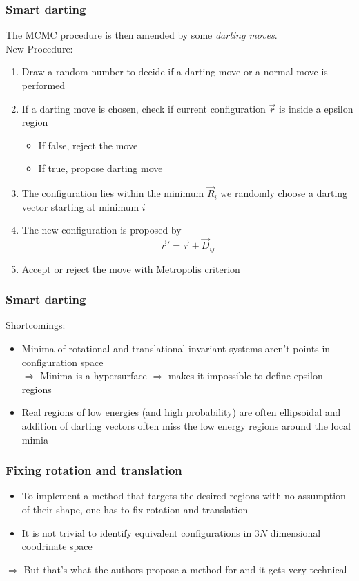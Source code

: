 \documentclass{beamer}
\begin{document}
	\begin{frame}
		\frametitle{Smart darting}
		The MCMC procedure is then amended by some \emph{darting moves}.\\
		New Procedure:
		\begin{enumerate}
			\item Draw a random number to decide if a darting move or a normal move is performed
			\item If a darting move is chosen, check if current configuration $\vec{r}$ is inside a epsilon region
			\begin{itemize}
				\item If false, reject the move
				\item If true, propose darting move
			\end{itemize}
			\item The configuration lies within the minimum $\vec{R}_i$ we randomly choose a darting vector starting at minimum $i$
			\item The new configuration is proposed by
			\begin{equation}
				\vec{r}'=\vec{r}+\vec{D}_{ij}
			\end{equation}
			\item Accept or reject the move with Metropolis criterion
		\end{enumerate}
	\end{frame}

	\begin{frame}
		\frametitle{Smart darting}
		Shortcomings:
		\begin{itemize}
			\item Minima of rotational and translational invariant systems aren't points in configuration space\\
			$\Rightarrow$ Minima is a hypersurface $\Rightarrow$ makes it impossible to define epsilon regions
			\item Real regions of low energies (and high probability) are often ellipsoidal and addition of darting vectors often miss the low energy regions around the local mimia
		\end{itemize}
	\end{frame}

	\begin{frame}
		\frametitle{Fixing rotation and translation}
		\begin{itemize}
			\item To implement a method that targets the desired regions with no assumption of their shape, one has to fix rotation and translation
			\item It is not trivial to identify equivalent configurations in $3N$ dimensional coodrinate space
		\end{itemize}
		$\Rightarrow$ But that's what the authors propose a method for and it gets very technical
	\end{frame}
\end{document}
